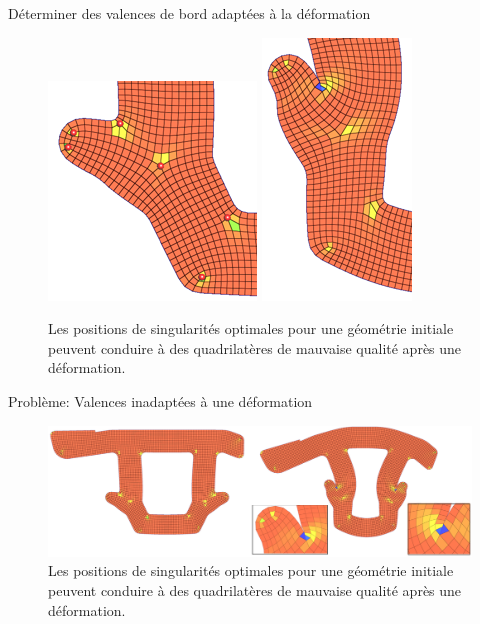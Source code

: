\begin{frame}{Déterminer des valences de bord adaptées à la déformation}
    \small
    \begin{figure}
        \centering
        \includegraphics[width=0.46\linewidth]{img/quadsimu/coin_pb_0.PNG}
        \includegraphics[width=0.27\linewidth]{img/quadsimu/coin_pb_1.PNG}
        \caption{Les positions de singularités optimales pour une géométrie initiale peuvent conduire à des quadrilatères de mauvaise qualité après une déformation.}
        \label{fig:asp_ratio_pb}
    \end{figure}
\end{frame}
\fi
\begin{frame}{Problème: Valences inadaptées à une déformation}
    \begin{figure}
        \centering
        \includegraphics[width=\linewidth]{img/new_images/echec_simu.PNG}
        \caption{Les positions de singularités optimales pour une géométrie initiale peuvent conduire à des quadrilatères de mauvaise qualité après une déformation.}
    \end{figure}
\end{frame}

